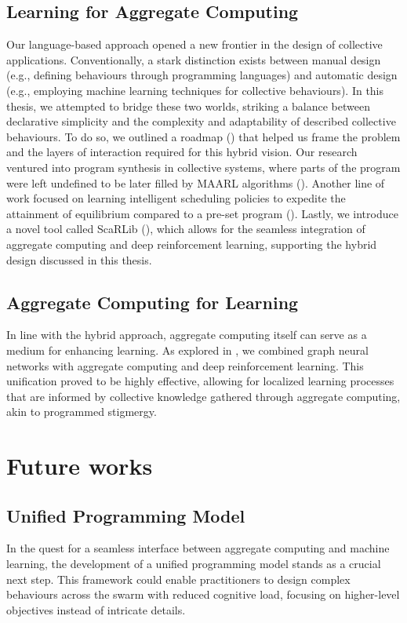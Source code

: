 \subsection*{Learning for Aggregate Computing}
Our language-based approach opened a new frontier in the design of collective applications. 
 Conventionally, a stark distinction exists between manual design (e.g., defining behaviours through programming languages) and automatic design (e.g., employing machine learning techniques for collective behaviours). 
% 
In this thesis, we attempted to bridge these two worlds,
 striking a balance between declarative simplicity and the complexity and adaptability of described collective behaviours. 
%
 To do so, we outlined a roadmap () that helped us frame the problem and the layers of interaction required for this hybrid vision.
% 
 Our research ventured into program synthesis in collective systems, 
 where parts of the program were left undefined to be later filled by \ac{MAARL} algorithms (). 
% 
Another line of work focused on learning intelligent scheduling policies to expedite the attainment of equilibrium compared to a pre-set program ().
%
Lastly, we introduce a novel tool called ScaRLib (), 
 which allows for the seamless integration of aggregate computing and deep reinforcement learning, 
 supporting the hybrid design discussed in this thesis.
\subsection*{Aggregate Computing for Learning}

In line with the hybrid approach, aggregate computing itself can serve as a medium for enhancing learning. As explored in , 
 we combined graph neural networks with aggregate computing and deep reinforcement learning. 
 This unification proved to be highly effective, 
 allowing for localized learning processes that are informed by collective knowledge gathered through aggregate computing, akin to programmed stigmergy.

\section{Future works}

\subsection*{Unified Programming Model}
In the quest for a seamless interface between aggregate computing and machine learning, 
 the development of a unified programming model stands as a crucial next step. 
 This framework could enable practitioners to design complex behaviours across the swarm with reduced cognitive load, focusing on higher-level objectives instead of intricate details. 

